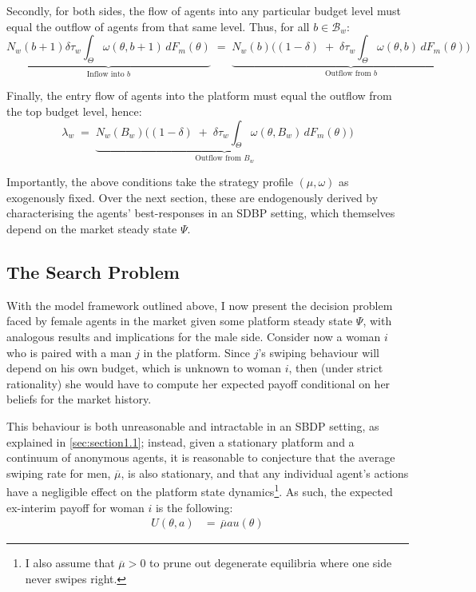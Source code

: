 Secondly, for both sides, the flow of agents into any particular budget level must equal the outflow of agents from that same level. Thus, for all $b\in\mathcal{B}_w$: 
\begin{equation}\label{eq:ss2} 
    \underbrace{N_w(b+1) \delta \tau_w \int_{\Theta} \omega(\theta,b+1)\,dF_{m}(\theta)}_{\text{Inflow into $b$}} \;=\; \underbrace{N_w(b) \Big( (1-\delta) \;+\; \delta \tau_w\int_{\Theta} \omega(\theta,b)\,dF_{m}(\theta)\Big)}_{\text{Outflow from $b$}}
\end{equation}

Finally, the entry flow of agents into the platform must equal the outflow from the top budget level, hence: 
\begin{equation}\label{eq:ss3} 
    \lambda_w \;=\; \underbrace{N_w(B_w) \Big( (1-\delta) \;+\; \delta \tau_w \int_{\Theta} \omega(\theta,B_w)\,dF_{m}(\theta) \Big)}_{\text{Outflow from $B_w$}}
\end{equation} 

Importantly, the above conditions take the strategy profile $(\mu,\omega)$ as exogenously fixed. Over the next section, these are endogenously derived by characterising the agents' best-responses in an SDBP setting, which themselves depend on the market steady state $\Psi$.

\subsection{The Search Problem}\label{sec:section2.3}
With the model framework outlined above, I now present the decision problem faced by female agents in the market given some platform steady state $\Psi$, with analogous results and implications for the male side. 
Consider now a woman $i$ who is paired with a man $j$ in the platform. Since $j$'s swiping behaviour will depend on his own budget, which is unknown to woman $i$, then (under strict rationality) she would have to compute her expected payoff conditional on her beliefs for the market history.

This behaviour is both unreasonable and intractable in an SBDP setting, as explained in \autoref{sec:section1.1}; instead, given a stationary platform and a continuum of anonymous agents, it is reasonable to conjecture that the average swiping rate for men, $\overline\mu$, is also stationary, and that any individual agent's actions have a negligible effect on the platform state dynamics\footnote{I also assume that $\overline\mu>0$ to prune out degenerate equilibria where one side never swipes right.}.
As such, the expected ex-interim payoff for woman $i$ is the following:
\begin{equation*}
    \begin{aligned}
        U(\theta, a)&= \,\overline{\mu} a u(\theta)%
    \end{aligned} 
\end{equation*} 

